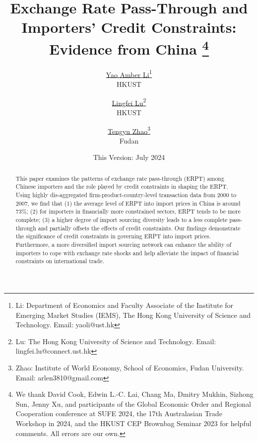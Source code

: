 

\linespread{1.2}
\geometry{a4paper,scale=0.75}



\title{  \Large \textbf{Exchange Rate Pass-Through and Importers' Credit Constraints: Evidence from China} 
\thanks{We thank David Cook, Edwin L.-C. Lai, Chang Ma, Dmitry Mukhin, Sizhong Sun, Jenny Xu, and participants of the Global Economic Order and Regional Cooperation conference at SUFE 2024, the 17th Australasian Trade Workshop in 2024, and the HKUST CEP Brownbag Seminar 2023 for helpful comments. All errors are our own.}}

\author{\large \href{http://yaoli.people.ust.hk/}{Yao Amber Li}\footnote{Li: Department of Economics and Faculty Associate of the Institute for Emerging Market Studies (IEMS), The Hong Kong University of Science and Technology. Email: yaoli@ust.hk}\\ {HKUST}
\and \href{}{Lingfei Lu}\footnote{Lu: The Hong Kong University of Science and Technology. Email: lingfei.lu@connect.ust.hk} \\ {HKUST} 
\and \href{}{Tengyu Zhao}\footnote{Zhao: Institute of World Economy, School of Economics, Fudan University. Email: arlen3810@gmail.com} \\ {Fudan} }

\date{This Version: July 2024}

\maketitle

\begin{abstract}
This paper examines the patterns of exchange rate pass-through (ERPT) among Chinese importers and the role played by credit constraints in shaping the ERPT. Using highly dis-aggregated firm-product-country-level transaction data from 2000 to 2007, we find that (1) the average level of ERPT into import prices in China is around 73\%; (2) for importers in financially more constrained sectors, ERPT tends to be more complete; (3) a higher degree of import sourcing diversity leads to a less complete pass-through and partially offsets the effects of credit constraints. Our findings demonstrate the significance of credit constraints in governing ERPT into import prices. Furthermore, a more diversified import sourcing network can enhance the ability of importers to cope with exchange rate shocks and help alleviate the impact of financial constraints on international trade.

\end{abstract}

